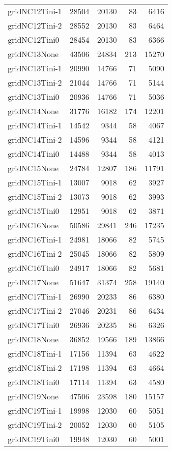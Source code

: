 \begin{longtable}{lrrrr}
gridNC12Tini-1 & 28504 & 20130 & 83 & 6416 \\
gridNC12Tini-2 & 28552 & 20130 & 83 & 6464 \\
gridNC12Tini0 & 28454 & 20130 & 83 & 6366 \\
gridNC13None & 43506 & 24834 & 213 & 15270 \\
gridNC13Tini-1 & 20990 & 14766 & 71 & 5090 \\
gridNC13Tini-2 & 21044 & 14766 & 71 & 5144 \\
gridNC13Tini0 & 20936 & 14766 & 71 & 5036 \\
gridNC14None & 31776 & 16182 & 174 & 12201 \\
gridNC14Tini-1 & 14542 & 9344 & 58 & 4067 \\
gridNC14Tini-2 & 14596 & 9344 & 58 & 4121 \\
gridNC14Tini0 & 14488 & 9344 & 58 & 4013 \\
gridNC15None & 24784 & 12807 & 186 & 11791 \\
gridNC15Tini-1 & 13007 & 9018 & 62 & 3927 \\
gridNC15Tini-2 & 13073 & 9018 & 62 & 3993 \\
gridNC15Tini0 & 12951 & 9018 & 62 & 3871 \\
gridNC16None & 50586 & 29841 & 246 & 17235 \\
gridNC16Tini-1 & 24981 & 18066 & 82 & 5745 \\
gridNC16Tini-2 & 25045 & 18066 & 82 & 5809 \\
gridNC16Tini0 & 24917 & 18066 & 82 & 5681 \\
gridNC17None & 51647 & 31374 & 258 & 19140 \\
gridNC17Tini-1 & 26990 & 20233 & 86 & 6380 \\
gridNC17Tini-2 & 27046 & 20231 & 86 & 6434 \\
gridNC17Tini0 & 26936 & 20235 & 86 & 6326 \\
gridNC18None & 36852 & 19566 & 189 & 13866 \\
gridNC18Tini-1 & 17156 & 11394 & 63 & 4622 \\
gridNC18Tini-2 & 17198 & 11394 & 63 & 4664 \\
gridNC18Tini0 & 17114 & 11394 & 63 & 4580 \\
gridNC19None & 47506 & 23598 & 180 & 15157 \\
gridNC19Tini-1 & 19998 & 12030 & 60 & 5051 \\
gridNC19Tini-2 & 20052 & 12030 & 60 & 5105 \\
gridNC19Tini0 & 19948 & 12030 & 60 & 5001 \\

\end{longtable}

